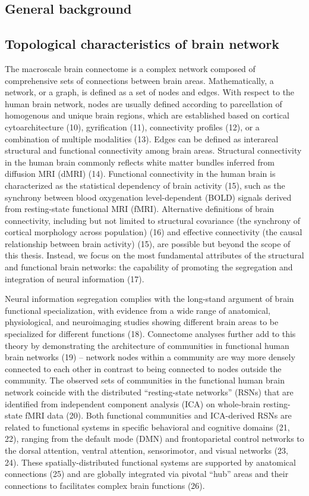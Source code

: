 \begin{refsection}
\section*{General background}
\subsection*{Topological characteristics of brain network}
The macroscale brain connectome is a complex network composed of comprehensive sets of connections between brain areas. Mathematically, a network, or a graph, is defined as a set of nodes and edges. With respect to the human brain network, nodes are usually defined according to parcellation of homogenous and unique brain regions, which are established based on cortical cytoarchitecture (10), gyrification (11), connectivity profiles (12), or a combination of multiple modalities (13). Edges can be defined as interareal structural and functional connectivity among brain areas. Structural connectivity in the human brain commonly reflects white matter bundles inferred from diffusion MRI (dMRI) (14). Functional connectivity in the human brain is characterized as the statistical dependency of brain activity (15), such as the synchrony between blood oxygenation level-dependent (BOLD) signals derived from resting-state functional MRI (fMRI). Alternative definitions of brain connectivity, including but not limited to structural covariance (the synchrony of cortical morphology across population) (16) and effective connectivity (the causal relationship between brain activity) (15), are possible but beyond the scope of this thesis. Instead, we focus on the most fundamental attributes of the structural and functional brain networks: the capability of promoting the segregation and integration of neural information (17).

Neural information segregation complies with the long-stand argument of brain functional specialization, with evidence from a wide range of anatomical, physiological, and neuroimaging studies showing different brain areas to be specialized for different functions (18). Connectome analyses further add to this theory by demonstrating the architecture of communities in functional human brain networks (19) -- network nodes within a community are way more densely connected to each other in contrast to being connected to nodes outside the community. The observed sets of communities in the functional human brain network coincide with the distributed “resting-state networks” (RSNs) that are identified from independent component analysis (ICA) on whole-brain resting-state fMRI data (20). Both functional communities and ICA-derived RSNs are related to functional systems in specific behavioral and cognitive domains  (21, 22), ranging from the default mode (DMN) and frontoparietal control networks to the dorsal attention, ventral attention, sensorimotor, and visual networks (23, 24). These spatially-distributed functional systems are supported by anatomical connections (25) and are globally integrated via pivotal “hub” areas and their connections to facilitates complex brain functions (26).


\end{refsection}
